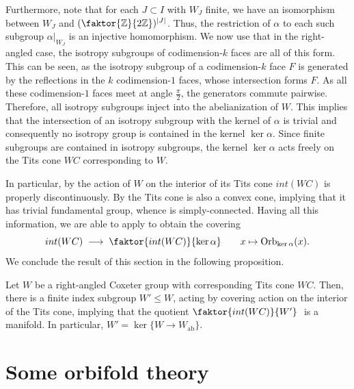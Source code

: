 Furthermore, note that for each \(J \subset I\) with \(W_J\) finite, we have an isomorphism between \(W_J\) and \((\faktor{\Z}{2\Z})^{\abs{J}}\).
Thus, the restriction of \(\alpha\) to each such subgroup \(\alpha\vert_{W_J}\) is an injective homomorphism.
We now use that in the right-angled case, the isotropy subgroups of codimension-\(k\) faces are all of this form.
This can be seen, as the isotropy subgroup of a codimension-\(k\) face \(F\) is generated by the reflections in the \(k\) codimension-\(1\) faces, whose intersection forms \(F\).
As all these codimension-\(1\) faces meet at angle \(\frac{\pi}{2}\), the generators commute pairwise.
Therefore, all isotropy subgroups inject into the abelianization of \(W\).
This implies that the intersection of an isotropy subgroup with the kernel of \(\alpha\) is trivial and consequently no isotropy group is contained in the kernel \(\ker\alpha\).
Since finite subgroups are contained in isotropy subgroups, the kernel \(\ker\alpha\) acts freely on the Tits cone \(WC\) corresponding to \(W\).

In particular, by  the action of \(W\) on the interior of its Tits cone \(int(WC)\) is properly discontinuously.
By  the Tits cone is also a convex cone, implying that it has trivial fundamental group, whence is simply-connected.
Having all this information, we are able to apply  to obtain the covering
\[int(WC) \;\longrightarrow\; \faktor{int(WC)}{\ker\alpha} \qquad x \mapsto \text{Orb}_{\ker\alpha}(x).\]
We conclude the result of this section in the following proposition.

\begin{proposition}
    Let \(W\) be a right-angled Coxeter group with corresponding Tits cone \(WC\). %
    Then, there is a finite index subgroup \(W' \leq W\), acting by covering action on the interior of the Tits cone, implying that the quotient \(\faktor{int(WC)}{W'}\;\) is a manifold.
    In particular, \(W' = \ker\{W \to W_{\text{ab}}\}\).
\end{proposition}


\section{Some orbifold theory}

